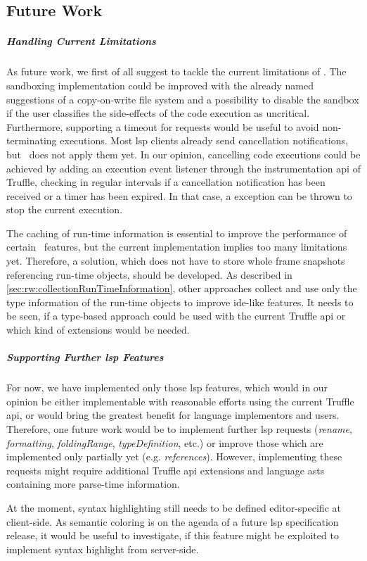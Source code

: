 \subsection{Future Work}

\subparagraph{Handling Current Limitations}
As future work, we first of all suggest to tackle the current limitations of \graallsp. The sandboxing implementation could be improved with the already named suggestions of a copy-on-write file system and a possibility to disable the sandbox if the user classifies the side-effects of the code execution as uncritical. Furthermore, supporting a timeout for requests would be useful to avoid non-terminating executions. Most \ac{lsp} clients already send cancellation notifications, but \graallsp~does not apply them yet. In our opinion, cancelling code executions could be achieved by adding an execution event listener through the instrumentation \ac{api} of Truffle, checking in regular intervals if a cancellation notification has been received or a timer has been expired. In that case, a  exception can be thrown to stop the current execution.

The caching of run-time information is essential to improve the performance of certain \graallsp~features, but the current implementation implies too many limitations yet. Therefore, a solution, which does not have to store whole frame snapshots referencing run-time objects, should be developed. As described in \autoref{sec:rw:collectionRunTimeInformation}, other approaches collect and use only the type information of the run-time objects to improve \ac{ide}-like features. It needs to be seen, if a type-based approach could be used with the current Truffle \ac{api} or which kind of extensions would be needed.

\subparagraph{Supporting Further \ac{lsp} Features}
For now, we have implemented only those \ac{lsp} features, which would in our opinion be either implementable with reasonable efforts using the current Truffle \ac{api}, or would bring the greatest benefit for language implementors and users. Therefore, one future work would be to implement further \ac{lsp} requests (\emph{rename}, \emph{formatting}, \emph{foldingRange}, \emph{typeDefinition}, etc.) or improve those which are implemented only partially yet (e.g. \emph{references}). However, implementing these requests might require additional Truffle \ac{api} extensions and language \acp{ast} containing more parse-time information.

At the moment, syntax highlighting still needs to be defined editor-specific at client-side. As semantic coloring is on the agenda of a future \ac{lsp} specification release, it would be useful to investigate, if this feature might be exploited to implement syntax highlight from server-side.

